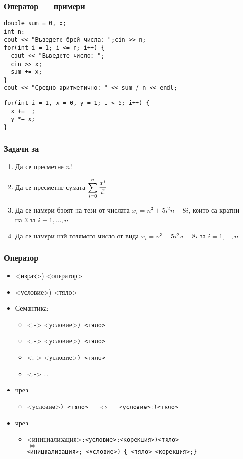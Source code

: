 \documentclass[alsotrans]{beamerswitch}
\newcommand{\expsum}{\displaystyle \sum_{i=0}^n \limits \frac{x^i}{i!}}
\begin{document}
\begin{frame}[fragile]
  \frametitle{Оператор  --- примери}

\begin{lstlisting}
double sum = 0, x;
int n;
cout << "Въведете брой числа: ";cin >> n;
for(int i = 1; i <= n; i++) {
  cout << "Въведете число: ";
  cin >> x;
  sum += x;
}
cout << "Средно аритметично: " << sum / n << endl;
\end{lstlisting}
\pause
\begin{lstlisting}
for(int i = 1, x = 0, y = 1; i < 5; i++) {
  x += i;
  y *= x;
}
\end{lstlisting}
\end{frame}

\begin{frame}
  \frametitle{Задачи за }

  \begin{enumerate}[<+->]
  \item Да се пресметне $n!$
  \item Да се пресметне сумата $\expsum$
  \item Да се намери броят на тези от числата $x_i = n^3 + 5i^2n -8i$, които са кратни на 3 за $i=1,\ldots,n$
  \item Да се намери най-голямото число от вида $x_i = n^3 + 5i^2n -8i$ за $i=1,\ldots,n$
  \end{enumerate}
\end{frame}

\begin{frame}
  \frametitle{Оператор }

  \begin{itemize}[<+->]
  \item {}<израз>\tta) <оператор>
  \item {}<условие>\tta) <тяло>
  \item Семантика:
    \begin{itemize}
    \item<.-> <условие>\tt) <тяло>
    \item<.-> <условие>\tt) <тяло>
    \item<.-> <условие>\tt) <тяло>
    \item<.-> \ldots
    \end{itemize}
  \item {} чрез 
    \begin{itemize}
    \item {}<условие>\tt) <тяло> $\quad\Leftrightarrow\quad$
      <условие>\tt{;)}<тяло>
    \end{itemize}
  \item {} чрез 
    \begin{itemize}
    \item {}<инициализация>\tt;<условие>\tt;<корекция>\tt)<тяло>\\
      $\Leftrightarrow$\\
      <инициализация>\tt; <условие>\tt{) \{ }<тяло> <корекция>\tt{;\}}
    \end{itemize}
  \end{itemize}
\end{frame}
\end{document}
